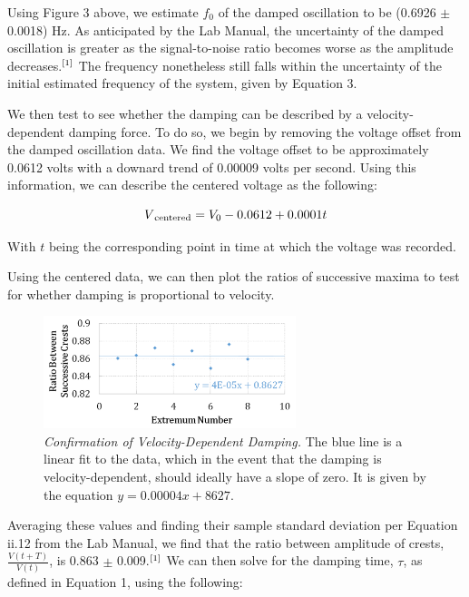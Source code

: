 \documentclass[twoside,twocolumn]{article}
\begin{document}
\noindent Using Figure 3 above, we estimate $f_0$ of the damped oscillation to be (0.6926 $\pm$ 0.0018) Hz. As anticipated by the Lab Manual, the uncertainty of the damped oscillation is greater as the signal-to-noise ratio becomes worse as the amplitude decreases.$\textsuperscript{[1]}$ The frequency nonetheless still falls within the uncertainty of the initial estimated frequency of the system, given by Equation 3.

\hfill

\noindent We then test to see whether the damping can be described by a velocity-dependent damping force. To do so, we begin by removing the voltage offset from the damped oscillation data. We find the voltage offset to be approximately 0.0612 volts with a downard trend of 0.00009 volts per second. Using this information, we can describe the centered voltage as the following:

\footnotesize
\begin{equation}
V\textsubscript{centered} = V_0 - 0.0612 + 0.0001t
\end{equation}
\normalsize

\noindent With $t$ being the corresponding point in time at which the voltage was recorded. 

\noindent Using the centered data, we can then plot the ratios of successive maxima to test for whether damping is proportional to velocity.

\begin{figure}[!htbp]
    \centering
    \includegraphics[width=2.9in]{Ratio.png}
    \caption{\textit{Confirmation of Velocity-Dependent Damping.} The blue line is a linear fit to the data, which in the event that the damping is velocity-dependent, should ideally have a slope of zero. It is given by the equation $y = 0.00004x + 8627$.}
\end{figure}

\noindent Averaging these values and finding their sample standard deviation per Equation ii.12 from the Lab Manual, we find that the ratio between amplitude of crests, $\frac{V(t+T)}{V(t)}$, is 0.863 $\pm$ 0.009.$\textsuperscript{[1]}$ We can then solve for the damping time, $\tau$, as defined in Equation 1, using the following:
\end{document}
